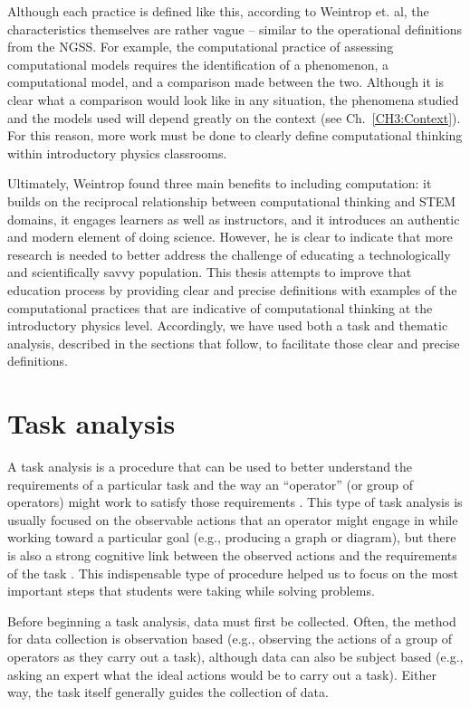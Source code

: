 \documentclass{msuphddissertation}
\begin{document}
\begin{doublespace}
Although each practice is defined like this, according to Weintrop et. al, the characteristics themselves are rather vague -- similar to the operational definitions from the NGSS.  For example, the computational practice of assessing computational models requires the identification of a phenomenon, a computational model, and a comparison made between the two.  Although it is clear what a comparison would look like in any situation, the phenomena studied and the models used will depend greatly on the context (see Ch.~\ref{CH3:Context}).  For this reason, more work must be done to clearly define computational thinking within introductory physics classrooms.

Ultimately, Weintrop found three main benefits to including computation: it builds on the reciprocal relationship between computational thinking and STEM domains, it engages learners as well as instructors, and it introduces an authentic and modern element of doing science.  However, he is clear to indicate that more research is needed to better address the challenge of educating a technologically and scientifically savvy population.  This thesis attempts to improve that education process by providing clear and precise definitions with examples of the computational practices that are indicative of computational thinking at the introductory physics level.  Accordingly, we have used both a task and thematic analysis, described in the sections that follow, to facilitate those clear and precise definitions.

\section{Task analysis}\label{CH2:TaskAnalysis}

A task analysis is a procedure that can be used to better understand the requirements of a particular task and the way an ``operator'' (or group of operators) might work to satisfy those requirements \cite{Kirwan2005}.  This type of task analysis is usually focused on the observable actions that an operator might engage in while working toward a particular goal (e.g., producing a graph or diagram), but there is also a strong cognitive link between the observed actions and the requirements of the task \cite{Crandall2006}.  This indispensable type of procedure helped us to focus on the most important steps that students were taking while solving problems.

Before beginning a task analysis, data must first be collected.  Often, the method for data collection is observation based (e.g., observing the actions of a group of operators as they carry out a task), although data can also be subject based (e.g., asking an expert what the ideal actions would be to carry out a task).  Either way, the task itself generally guides the collection of data.


\end{doublespace}
\end{document}

